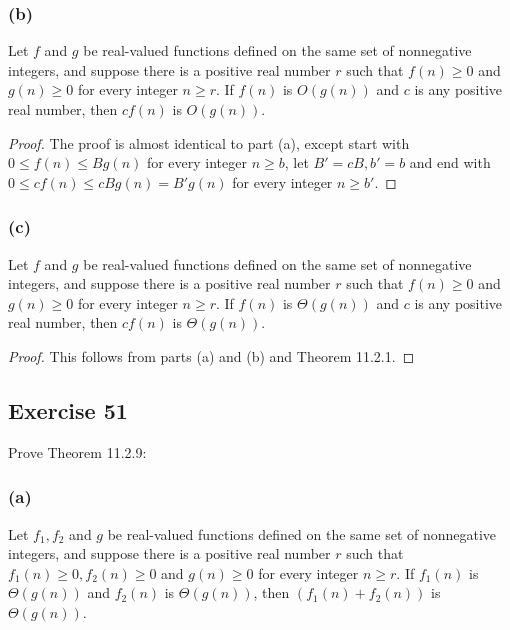 \documentclass[14pt]{extarticle}
\begin{document}
\subsubsection{(b)}
Let \(f\) and \(g\) be real-valued functions defined on the same set of nonnegative integers, and suppose there is a
positive real number \(r\) such that \(f(n) \geq 0\) and \(g(n) \geq 0\) for every integer \(n \geq r\). If \(f(n)\) is
\(O(g(n))\) and \(c\) is any positive real number, then \(cf(n)\) is \(O(g(n))\).

\begin{proof}
    The proof is almost identical to part (a), except start with \(0 \leq f(n) \leq Bg(n)\) for every integer \(n \geq b\), let
    \(B' = cB, b' = b\) and end with \(0 \leq cf(n) \leq cBg(n) = B'g(n)\) for every integer \(n \geq b'\).
\end{proof}

\subsubsection{(c)}
Let \(f\) and \(g\) be real-valued functions defined on the same set of nonnegative integers, and suppose there is a
positive real number \(r\) such that \(f(n) \geq 0\) and \(g(n) \geq 0\) for every integer \(n \geq r\). If \(f(n)\) is
\(\Theta(g(n))\) and \(c\) is any positive real number, then \(cf(n)\) is \(\Theta(g(n))\).

\begin{proof}
    This follows from parts (a) and (b) and Theorem 11.2.1.
\end{proof}

\subsection{Exercise 51}
Prove Theorem 11.2.9:

\subsubsection{(a)}
Let \(f_1, f_2\) and \(g\) be real-valued functions defined on the same set of nonnegative integers, and suppose there is a
positive real number \(r\) such that \(f_1(n) \geq 0, f_2(n) \geq 0\) and \(g(n) \geq 0\) for every integer \(n \geq r\).
If \(f_1(n)\) is \(\Theta(g(n))\) and \(f_2(n)\) is \(\Theta (g(n))\), then \((f_1(n) + f_2(n))\) is \(\Theta(g(n))\).
\end{document}
